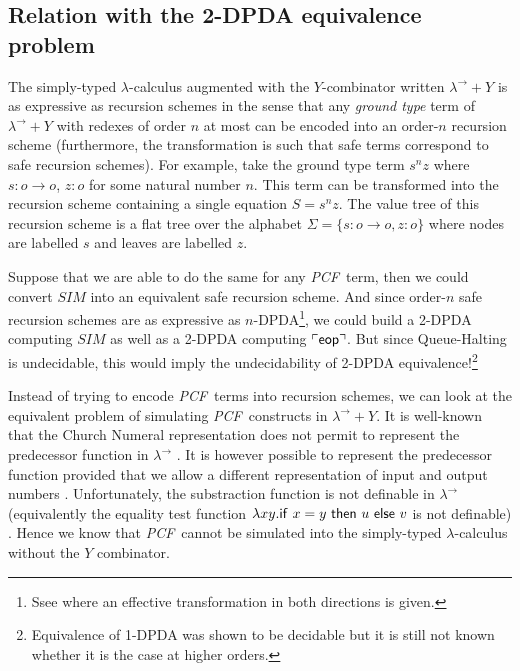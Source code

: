 \documentclass{article}
\newcommand{\encode}[1]{\ulcorner #1 \urcorner}
\newcommand\eop{{\sf eop}}
\newcommand\pcf{\textsl{PCF}}
\begin{document}
\subsection{Relation with the 2-DPDA equivalence problem}

The simply-typed $\lambda$-calculus augmented with the
$Y$-combinator written $\lambda^\rightarrow + Y$ is as expressive as
recursion schemes in the sense that any \emph{ground type} term of
$\lambda^\rightarrow + Y$ with redexes of order $n$ at most can be
encoded into an order-$n$ recursion scheme (furthermore, the
transformation is such that safe terms correspond to safe recursion
schemes). For example, take the ground type term $s^n z$ where
$s:o\rightarrow o$, $z :o$ for some natural number $n$. This term
can be transformed into the recursion scheme containing a single
equation $S = s^n z$. The value tree of this recursion scheme is a
flat tree over the alphabet $\Sigma = \{s:o\rightarrow o, z:o\}$
where nodes are labelled $s$ and leaves are labelled $z$.


Suppose that we are able to do the same for any \pcf\ term, then we
could convert $SIM$ into an equivalent safe recursion scheme. And
since order-$n$ safe recursion schemes are as expressive as
$n$-DPDA\footnote{Ssee \cite{KNU02} where an effective
transformation in both directions is given.}, we could build a
2-DPDA computing $SIM$ as well as a 2-DPDA computing
$\encode{\eop}$. But since Queue-Halting is undecidable, this would
imply the undecidability of 2-DPDA equivalence!\footnote{Equivalence
of 1-DPDA was shown to be decidable but it is still not known
whether it is the case at higher orders.}

Instead of trying to encode  \pcf\ terms into recursion schemes, we
can look at the equivalent problem of simulating \pcf\ constructs in
$\lambda^\rightarrow + Y$. It is well-known that the Church Numeral
representation does not permit to represent the predecessor function
in $\lambda^\rightarrow$ \cite{DBLP:journals/jacm/FortuneLO83}. It
is however possible to represent the predecessor function provided
that we allow a different representation of input and output numbers
\cite{DBLP:journals/jacm/FortuneLO83}. Unfortunately, the
substraction function is not definable in $\lambda^\rightarrow$
(equivalently  the equality test function $\lambda xy. {\sf if\ } x
= y {\sf\ then\ } u {\sf\ else\ } v$ is not definable)
\cite{DBLP:journals/jacm/FortuneLO83}. Hence we know that \pcf\
cannot be simulated into the simply-typed $\lambda$-calculus without
the $Y$ combinator.
\end{document}
